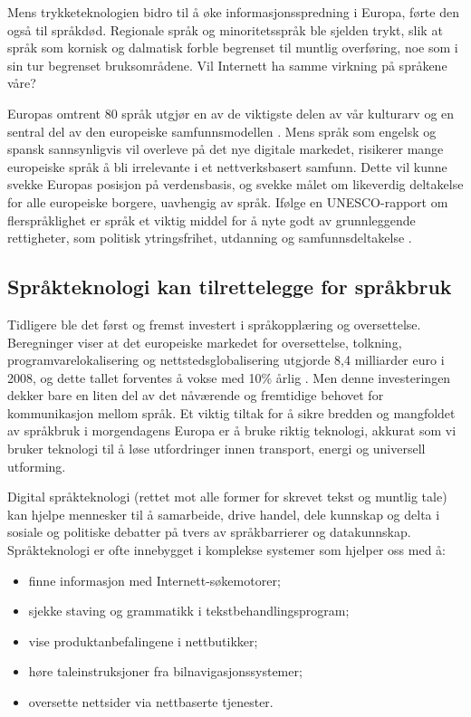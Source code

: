 \begin{multicols}{2}
Mens trykketeknologien bidro til å øke informasjonsspredning i Europa, førte den også til språkdød. Regionale språk og minoritetsspråk ble sjelden trykt, slik at språk som kornisk og dalmatisk forble begrenset til muntlig overføring, noe som i sin tur begrenset bruksområdene. Vil Internett ha samme virkning på språkene våre?


Europas omtrent 80 språk utgjør en av de viktigste delen av vår kulturarv og en sentral del av den europeiske samfunnsmodellen \cite{EC2}. Mens språk som engelsk og spansk sannsynligvis vil overleve på det nye digitale markedet, risikerer mange europeiske språk å bli irrelevante i et nettverksbasert samfunn. Dette vil kunne svekke Europas posisjon på verdensbasis, og svekke målet om likeverdig deltakelse for alle europeiske borgere, uavhengig av språk. Ifølge en UNESCO-rapport om flerspråklighet er språk et viktig middel for å nyte godt av grunnleggende rettigheter, som politisk ytringsfrihet, utdanning og samfunnsdeltakelse \cite{Unesco1}.

\subsection{Språkteknologi kan tilrettelegge for språkbruk}

Tidligere ble det først og fremst investert i språkopplæring og oversettelse. Beregninger viser at det europeiske markedet for oversettelse, tolkning, programvarelokalisering og nettstedsglobalisering utgjorde 8,4 milliarder euro i 2008, og dette tallet forventes å vokse med 10\% årlig \cite{EC3}. Men denne investeringen dekker bare en liten del av det nåværende og fremtidige behovet for kommunikasjon mellom språk. Et viktig tiltak for å sikre bredden og mangfoldet av språkbruk i morgendagens Europa er å bruke riktig teknologi, akkurat som vi bruker teknologi til å løse utfordringer innen transport, energi og universell utforming.

Digital språkteknologi (rettet mot alle former for skrevet tekst og muntlig tale) kan hjelpe mennesker til å samarbeide, drive handel, dele kunnskap og delta i sosiale og politiske debatter på tvers av språkbarrierer og datakunnskap. Språkteknologi er ofte innebygget i  komplekse systemer som hjelper oss med å:

\begin{itemize}
\item finne informasjon med Internett-søkemotorer;
\item sjekke staving og grammatikk i tekstbehandlingsprogram;
\item vise produktanbefalingene i nettbutikker;
\item høre taleinstruksjoner fra bilnavigasjonssystemer;
\item oversette nettsider via nettbaserte tjenester.
\end{itemize}


\end{multicols}
